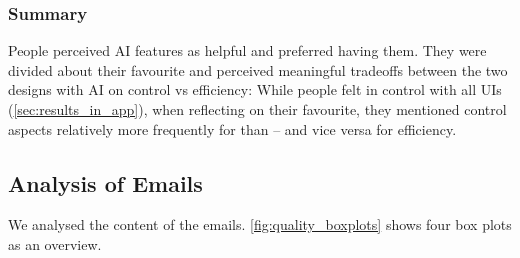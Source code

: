 \subsubsection{Summary}
People perceived AI features as helpful and preferred having them. They were divided about their favourite and perceived meaningful tradeoffs between the two designs with AI on control vs efficiency: While people felt in control with all UIs (\cref{sec:results_in_app}), when reflecting on their favourite, they mentioned control aspects relatively more frequently for \modeours{} than \modemail{} -- and vice versa for efficiency.




\subsection{Analysis of Emails}\label{sec:results_emails}
We analysed the content of the emails. \cref{fig:quality_boxplots} shows four box plots as an overview.

